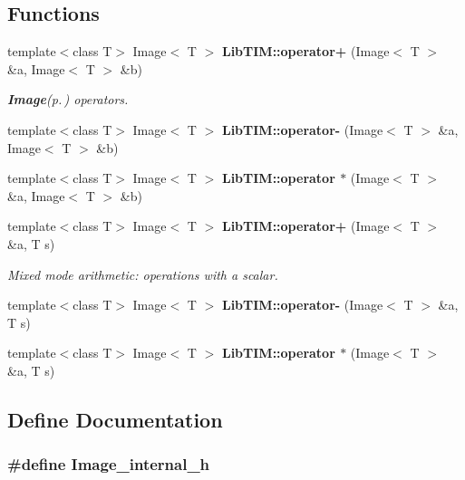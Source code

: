 \subsection*{Functions}
\begin{CompactItemize}
\item 
template$<$class T$>$ Image$<$ T $>$ {\bf Lib\-TIM::operator+} (Image$<$ T $>$ \&a, Image$<$ T $>$ \&b)
\begin{CompactList}\small\item\em {\bf Image}{\rm (p.\,\pageref{classLibTIM_1_1Image})} operators. \item\end{CompactList}\item 
template$<$class T$>$ Image$<$ T $>$ {\bf Lib\-TIM::operator-} (Image$<$ T $>$ \&a, Image$<$ T $>$ \&b)
\item 
template$<$class T$>$ Image$<$ T $>$ {\bf Lib\-TIM::operator $\ast$} (Image$<$ T $>$ \&a, Image$<$ T $>$ \&b)
\item 
template$<$class T$>$ Image$<$ T $>$ {\bf Lib\-TIM::operator+} (Image$<$ T $>$ \&a, T s)
\begin{CompactList}\small\item\em Mixed mode arithmetic: operations with a scalar. \item\end{CompactList}\item 
template$<$class T$>$ Image$<$ T $>$ {\bf Lib\-TIM::operator-} (Image$<$ T $>$ \&a, T s)
\item 
template$<$class T$>$ Image$<$ T $>$ {\bf Lib\-TIM::operator $\ast$} (Image$<$ T $>$ \&a, T s)
\end{CompactItemize}


\subsection{Define Documentation}
\subsubsection{\setlength{\rightskip}{0pt plus 5cm}\#define Image\_\-internal\_\-h}\label{Image_8h_a0}


